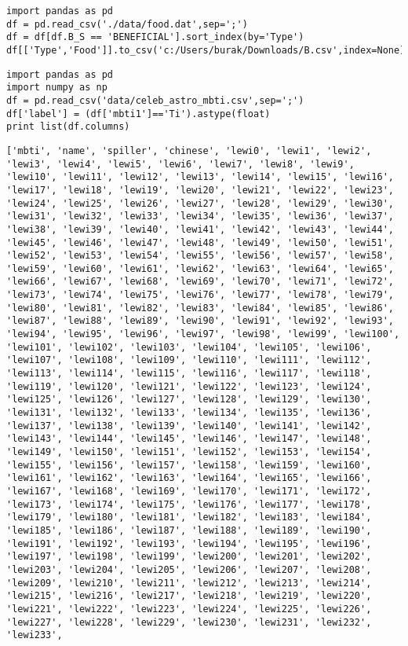 \documentclass[12pt,fleqn]{article}\usepackage{../common}
\begin{document}
\begin{verbatim}
import pandas as pd
df = pd.read_csv('./data/food.dat',sep=';')
df = df[df.B_S == 'BENEFICIAL'].sort_index(by='Type')
df[['Type','Food']].to_csv('c:/Users/burak/Downloads/B.csv',index=None)
\end{verbatim}

\begin{verbatim}
import pandas as pd
import numpy as np
df = pd.read_csv('data/celeb_astro_mbti.csv',sep=';')
df['label'] = (df['mbti1']=='Ti').astype(float)
print list(df.columns)
\end{verbatim}

\begin{verbatim}
['mbti', 'name', 'spiller', 'chinese', 'lewi0', 'lewi1', 'lewi2', 'lewi3', 'lewi4', 'lewi5', 'lewi6', 'lewi7', 'lewi8', 'lewi9', 'lewi10', 'lewi11', 'lewi12', 'lewi13', 'lewi14', 'lewi15', 'lewi16', 'lewi17', 'lewi18', 'lewi19', 'lewi20', 'lewi21', 'lewi22', 'lewi23', 'lewi24', 'lewi25', 'lewi26', 'lewi27', 'lewi28', 'lewi29', 'lewi30', 'lewi31', 'lewi32', 'lewi33', 'lewi34', 'lewi35', 'lewi36', 'lewi37', 'lewi38', 'lewi39', 'lewi40', 'lewi41', 'lewi42', 'lewi43', 'lewi44', 'lewi45', 'lewi46', 'lewi47', 'lewi48', 'lewi49', 'lewi50', 'lewi51', 'lewi52', 'lewi53', 'lewi54', 'lewi55', 'lewi56', 'lewi57', 'lewi58', 'lewi59', 'lewi60', 'lewi61', 'lewi62', 'lewi63', 'lewi64', 'lewi65', 'lewi66', 'lewi67', 'lewi68', 'lewi69', 'lewi70', 'lewi71', 'lewi72', 'lewi73', 'lewi74', 'lewi75', 'lewi76', 'lewi77', 'lewi78', 'lewi79', 'lewi80', 'lewi81', 'lewi82', 'lewi83', 'lewi84', 'lewi85', 'lewi86', 'lewi87', 'lewi88', 'lewi89', 'lewi90', 'lewi91', 'lewi92', 'lewi93', 'lewi94', 'lewi95', 'lewi96', 'lewi97', 'lewi98', 'lewi99', 'lewi100', 'lewi101', 'lewi102', 'lewi103', 'lewi104', 'lewi105', 'lewi106', 'lewi107', 'lewi108', 'lewi109', 'lewi110', 'lewi111', 'lewi112', 'lewi113', 'lewi114', 'lewi115', 'lewi116', 'lewi117', 'lewi118', 'lewi119', 'lewi120', 'lewi121', 'lewi122', 'lewi123', 'lewi124', 'lewi125', 'lewi126', 'lewi127', 'lewi128', 'lewi129', 'lewi130', 'lewi131', 'lewi132', 'lewi133', 'lewi134', 'lewi135', 'lewi136', 'lewi137', 'lewi138', 'lewi139', 'lewi140', 'lewi141', 'lewi142', 'lewi143', 'lewi144', 'lewi145', 'lewi146', 'lewi147', 'lewi148', 'lewi149', 'lewi150', 'lewi151', 'lewi152', 'lewi153', 'lewi154', 'lewi155', 'lewi156', 'lewi157', 'lewi158', 'lewi159', 'lewi160', 'lewi161', 'lewi162', 'lewi163', 'lewi164', 'lewi165', 'lewi166', 'lewi167', 'lewi168', 'lewi169', 'lewi170', 'lewi171', 'lewi172', 'lewi173', 'lewi174', 'lewi175', 'lewi176', 'lewi177', 'lewi178', 'lewi179', 'lewi180', 'lewi181', 'lewi182', 'lewi183', 'lewi184', 'lewi185', 'lewi186', 'lewi187', 'lewi188', 'lewi189', 'lewi190', 'lewi191', 'lewi192', 'lewi193', 'lewi194', 'lewi195', 'lewi196', 'lewi197', 'lewi198', 'lewi199', 'lewi200', 'lewi201', 'lewi202', 'lewi203', 'lewi204', 'lewi205', 'lewi206', 'lewi207', 'lewi208', 'lewi209', 'lewi210', 'lewi211', 'lewi212', 'lewi213', 'lewi214', 'lewi215', 'lewi216', 'lewi217', 'lewi218', 'lewi219', 'lewi220', 'lewi221', 'lewi222', 'lewi223', 'lewi224', 'lewi225', 'lewi226', 'lewi227', 'lewi228', 'lewi229', 'lewi230', 'lewi231', 'lewi232', 'lewi233', 
\end{verbatim}
\end{document}
